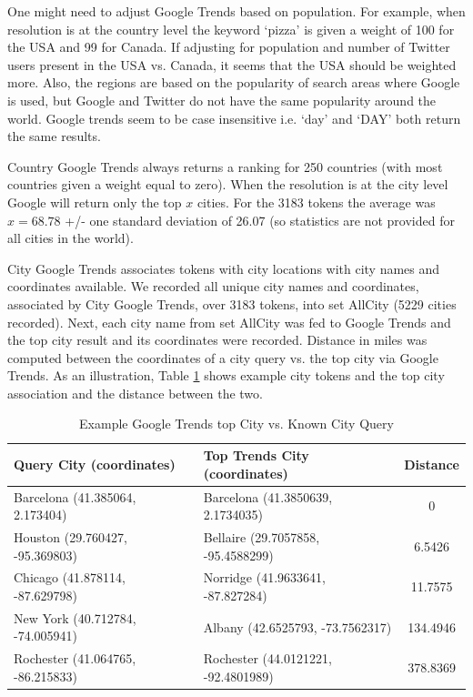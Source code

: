 One might need to adjust Google Trends based on population. For example, when resolution is at the country level the keyword `pizza' is given a weight of 100 for the USA and 99 for Canada. If adjusting for population and number of Twitter users present in the USA vs. Canada, it seems that the USA should be weighted more. Also, the regions are based on the popularity of search areas where Google is used, but Google and Twitter do not have the same popularity around the world. Google trends seem to be case insensitive i.e. `day’ and `DAY’ both return the same results.

Country Google Trends always returns a ranking for 250 countries (with most countries given a weight equal to zero). When the resolution is at the city level Google will return only the top $x$ cities. For the 3183 tokens the average was $x=68.78$ +/- one standard deviation of 26.07 (so statistics are not provided for all cities in the world).

City Google Trends associates tokens with city locations with city names and coordinates available. We recorded all unique city names and coordinates, associated by City Google Trends, over 3183 tokens, into set AllCity (5229 cities recorded). Next, each city name from set AllCity was fed to Google Trends and the top city result and its coordinates were recorded. Distance in miles was computed between the coordinates of a city query vs. the top city via Google Trends. As an illustration, Table \ref{table_5new_4} shows example city tokens and the top city association and the distance between the two.

\begin{table}[htbp]
\small
\caption{Example Google Trends top City vs. Known City Query}
\label{table_5new_4}
\centering
\begin{tabular}{|l|l|c|}
\hline
\bfseries Query City (coordinates) & \bfseries Top Trends City (coordinates) & \bfseries Distance\\
\hline
Barcelona (41.385064, 2.173404)& Barcelona (41.3850639, 2.1734035) & 0\\
\hline
Houston (29.760427, -95.369803)&Bellaire (29.7057858, -95.4588299) & 6.5426\\
\hline
Chicago (41.878114, -87.629798)&Norridge (41.9633641, -87.827284) &11.7575\\
\hline
New York (40.712784, -74.005941)&Albany (42.6525793, -73.7562317) &134.4946\\
\hline
Rochester (41.064765, -86.215833)&Rochester (44.0121221, -92.4801989) &378.8369\\
\hline
\end{tabular}
\end{table}

